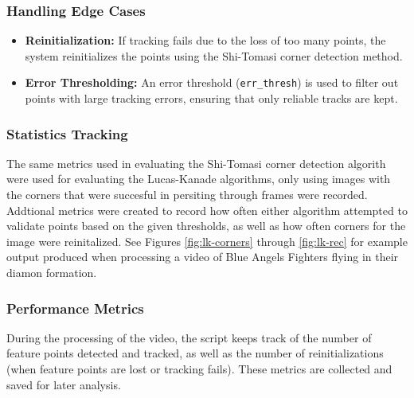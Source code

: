 \documentclass[11pt, conference, letterpaper]{IEEEtran}
\begin{document}
\subsubsection{Handling Edge Cases}
\begin{itemize}
    \item \textbf{Reinitialization:} If tracking fails due to the loss of too many points, the system reinitializes the points using the Shi-Tomasi corner detection method.
    \item \textbf{Error Thresholding:} An error threshold (\texttt{err\_thresh}) is used to filter out points with large tracking errors, ensuring that only reliable tracks are kept.
\end{itemize}
\bigskip

\subsubsection{Statistics Tracking}
The same metrics used in evaluating the Shi-Tomasi corner detection algorith were used for evaluating the Lucas-Kanade algorithms, only using images with the corners that were succesful in persiting through frames were recorded. Addtional metrics were created to record how often either algorithm attempted to validate points based on the given thresholds, as well as how often corners for the image were reinitalized. See Figures \ref{fig:lk-corners} through \ref{fig:lk-rec} for example output produced when processing a video of Blue Angels Fighters flying in their diamon formation.
\bigskip

\subsubsection{Performance Metrics}
During the processing of the video, the script keeps track of the number of feature points detected and tracked, as well as the number of reinitializations (when feature points are lost or tracking fails). These metrics are collected and saved for later analysis.
\bigskip
\end{document}
